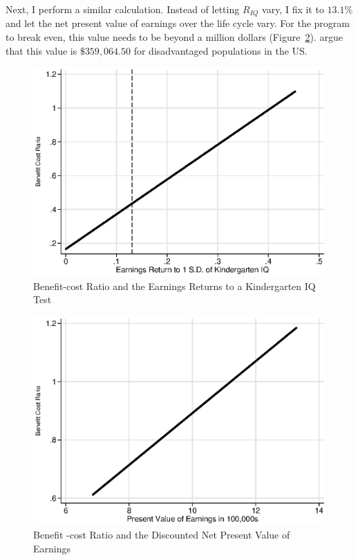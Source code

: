 \noindent Next, I perform a similar calculation. Instead of letting $R_{IQ}$ vary, I fix it to $13.1\%$ and let the net present value of earnings over the life cycle vary. For the program to break even, this value needs to be beyond a million dollars (Figure~\ref{figuresecond}). \citet{Kline-Walters_2015_NBER-Evaluating} argue that this value is $\$359,064.50$ for disadvantaged populations in the US.

\begin{center}
\begin{figure}[H] 
\caption{Benefit-cost Ratio and the Earnings Returns to a Kindergarten IQ Test} \label{figure:first}
\centering
\includegraphics[width=.68\columnwidth]{Output/abc_chettytype_return.eps}
\end{figure}
\end{center}

\begin{center}
\begin{figure}[H] 
\caption{Benefit -cost Ratio and the Discounted Net Present Value of Earnings}
\label{figuresecond}
\centering
\includegraphics[width=.68\columnwidth]{Output/abc_chettytype_pv.eps}
\end{figure}
\end{center}

\renewcommand{\refname}{Appendix References}
\clearpage
\singlespace



 